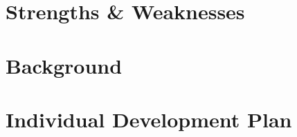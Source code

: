 \documentclass[fleqn,10pt]{SelfArx} %
\affiliation{*\textbf{Corresponding author}: shelby@shelbydarnell.com} %
\begin{document}
\maketitle %

\tableofcontents %

\thispagestyle{empty} %





%


\section{Strengths \& Weaknesses}\label{sec:weaknesses}





\section{Background}\label{sec:background}



\section{Individual Development Plan}\label{sec:idp}



\end{document}
